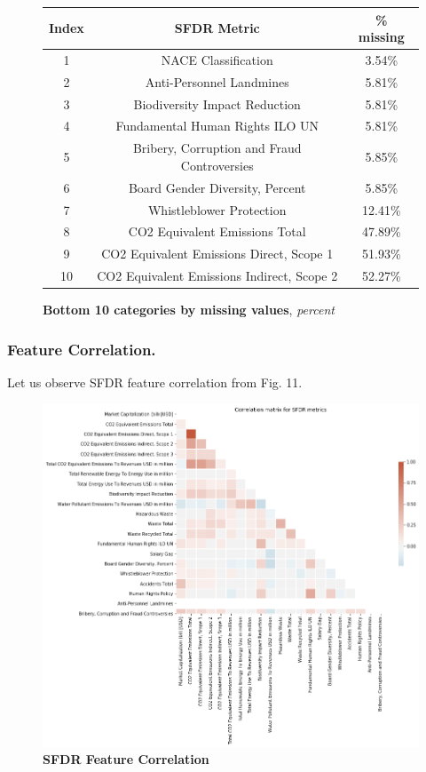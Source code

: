 \documentclass[12pt]{report}
\begin{document}
\begin{figure}[h!]
\begin{center}
\begin{tabular}{ |c|c|c| }
\hline
 Index & SFDR Metric & \% missing \\
 \hline\hline
 1 & NACE Classification & 3.54\% \\  
 2 & Anti-Personnel Landmines & 5.81\% \\
 3 & Biodiversity Impact Reduction & 5.81\% \\
 4 & Fundamental Human Rights ILO UN & 5.81\% \\
 5 & Bribery, Corruption and Fraud Controversies & 5.85\% \\
 6 & Board Gender Diversity, Percent & 5.85\% \\
 7 & Whistleblower Protection & 12.41\% \\
 8 & CO2 Equivalent Emissions Total & 47.89\% \\
 9 & CO2 Equivalent Emissions Direct, Scope 1 & 51.93\% \\
 10 & CO2 Equivalent Emissions Indirect, Scope 2 & 52.27\% \\
\hline
\end{tabular}
\end{center}
\caption{\textbf{Bottom 10 categories by missing values}, \textit{percent}}
\label{fig:bottom10missing}
\end{figure}

\subsubsection{Feature Correlation.}
Let us observe SFDR feature correlation from Fig. 11.  
\begin{figure}[h!]
\centering
\includegraphics[scale=0.5]{correlation_matrix.png}
\caption{\textbf{SFDR Feature Correlation}}
\label{fig:correlation_sfdr}
\end{figure}
\end{document}
